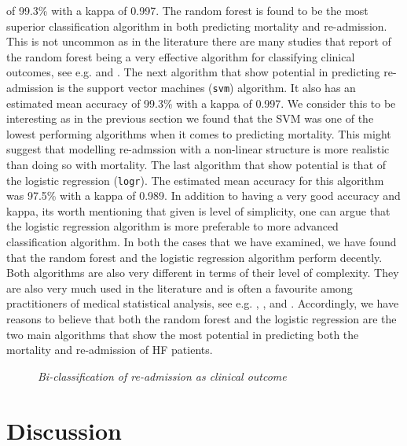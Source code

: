 \documentclass[../thesis.tex]{subfiles}
\begin{document}
\noindent of 99.3\% with a kappa of 0.997. The random forest is found to be the most superior classification algorithm in both predicting mortality and re-admission. This is not uncommon as in the literature there are many studies that report of the random forest being a very effective algorithm for classifying clinical outcomes, see e.g. \cite{austin2013using} and \cite{zolfaghar2013big}. The next algorithm that show potential in predicting re-admission is the support vector machines (\texttt{svm}) algorithm. It also has an estimated mean accuracy of 99.3\% with a kappa of 0.997. We consider this to be interesting as in the previous section we found that the SVM was one of the lowest performing algorithms when it comes to predicting mortality. This might suggest that modelling re-admssion with a non-linear structure is more realistic than doing so with mortality. The last algorithm that show potential is that of the logistic regression (\texttt{logr}). The estimated mean accuracy for this algorithm was 97.5\% with a kappa of 0.989. In addition to having a very good accuracy and kappa, its worth mentioning that given is level of simplicity, one can argue that the logistic regression algorithm is more preferable to more advanced classification algorithm. In both the cases that we have examined, we have found that the random forest and the logistic regression algorithm perform decently. Both algorithms are also very different in terms of their level of complexity. They are also very much used in the literature and is often a favourite among practitioners of medical statistical analysis, see e.g. \cite{austin2013using}, \cite{zolfaghar2013big}, \cite{shah2014phenomapping} and \cite{panahiazar2015using}. Accordingly, we have reasons to believe that both the random forest and the logistic regression are the two main algorithms that show the most potential in predicting both the mortality and re-admission of HF patients.

\begin{figure}[th!]
    \centering
    \scalebox{.8}{}
    \caption[Bi-classification of re-admission as clinical outcome]{\textit{Bi-classification of re-admission as clinical outcome}}
    \label{fig:bi_class_read}
\end{figure}

\section{Discussion}
\end{document}
